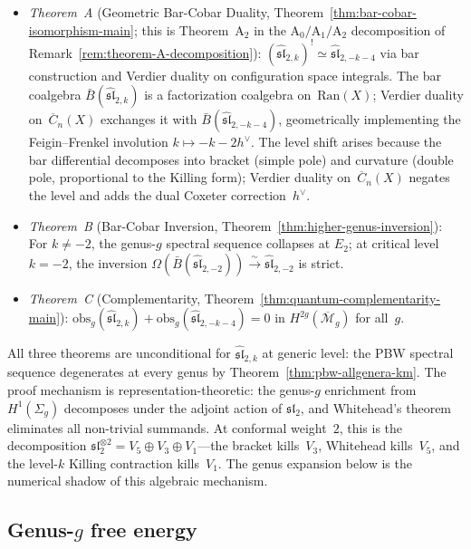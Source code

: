 \begin{itemize}
\item \emph{Theorem~A} (Geometric Bar-Cobar Duality, Theorem~\ref{thm:bar-cobar-isomorphism-main}; this is Theorem~$\mathrm{A}_2$ in the $\mathrm{A}_0/\mathrm{A}_1/\mathrm{A}_2$ decomposition of Remark~\ref{rem:theorem-A-decomposition}):
$(\widehat{\mathfrak{sl}}_{2,k})^! \simeq
\widehat{\mathfrak{sl}}_{2,-k-4}$ via bar construction and Verdier
duality on configuration space integrals.  The bar coalgebra
$\bar{B}(\widehat{\mathfrak{sl}}_{2,k})$ is a factorization
coalgebra on~$\mathrm{Ran}(X)$; Verdier duality
on~$\overline{C}_n(X)$ exchanges it with
$\bar{B}(\widehat{\mathfrak{sl}}_{2,-k-4})$, geometrically
implementing the Feigin--Frenkel involution
$k \mapsto -k - 2h^\vee$.  The level shift arises because the bar differential decomposes
into bracket (simple pole) and curvature (double pole, proportional
to the Killing form); Verdier duality on~$\overline{C}_n(X)$
negates the level and adds the dual Coxeter
correction~$h^\vee$.
\item \emph{Theorem~B} (Bar-Cobar Inversion, Theorem~\ref{thm:higher-genus-inversion}):
For $k \neq -2$, the genus-$g$ spectral sequence collapses at $E_2$; at critical level $k = -2$, the inversion $\Omega(\bar{B}(\widehat{\mathfrak{sl}}_{2,-2})) \xrightarrow{\sim} \widehat{\mathfrak{sl}}_{2,-2}$ is strict.
\item \emph{Theorem~C} (Complementarity, Theorem~\ref{thm:quantum-complementarity-main}):
$\mathrm{obs}_g(\widehat{\mathfrak{sl}}_{2,k}) + \mathrm{obs}_g(\widehat{\mathfrak{sl}}_{2,-k-4}) = 0$ in $H^{2g}(\overline{\mathcal{M}}_g)$ for all~$g$.
\end{itemize}

All three theorems are unconditional for $\widehat{\mathfrak{sl}}_{2,k}$
at generic level: the PBW spectral sequence degenerates at every
genus by Theorem~\ref{thm:pbw-allgenera-km}.  The proof mechanism is
representation-theoretic: the genus-$g$ enrichment from
$H^1(\Sigma_g)$ decomposes under the adjoint action of
$\mathfrak{sl}_2$, and Whitehead's theorem eliminates all non-trivial
summands.  At conformal weight~$2$, this is the decomposition
$\mathfrak{sl}_2^{\otimes 2} = V_5 \oplus V_3 \oplus V_1$---the
bracket kills~$V_3$, Whitehead kills~$V_5$, and the
level-$k$ Killing contraction kills~$V_1$.
The genus expansion below
is the numerical shadow of this algebraic mechanism.

\subsection{\texorpdfstring{Genus-$g$ free energy}{Genus-g free energy}}\label{subsec:sl2-free-energy}

